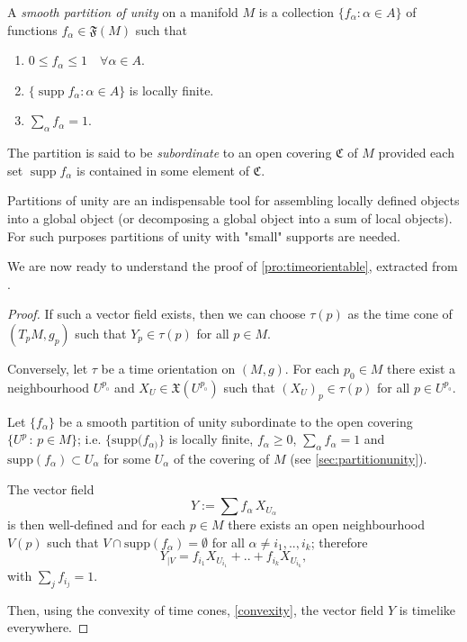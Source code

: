 \begin{definition}
	A \emph{smooth partition of unity} on a manifold $M$ is a collection $\{f_\alpha \colon \alpha \in A\}$ of functions $f_\alpha \in \mathfrak{F}(M)$ such that
	\begin{enumerate}
		\item $0 \leq f_\alpha \leq 1 \quad \forall \alpha \in A$.
		\item $\{\operatorname{supp} f_\alpha \colon \alpha \in A\}$ is locally finite.
		\item $\sum_\alpha f_\alpha = 1$.
	\end{enumerate}
	
	The partition is said to be \emph{subordinate} to an open covering $\mathfrak{C}$ of $M$ provided each set $\operatorname{supp} f_\alpha$ is contained in some element of $\mathfrak{C}$.
\end{definition}

Partitions of unity are an indispensable tool for assembling locally defined  objects into a global object (or decomposing a global object into a sum of local objects). For such purposes  partitions of unity with "small" supports are needed.

We are now ready to understand the proof of \autoref{pro:timeorientable}, extracted from \cite[p. 201]{romero10}.

\begin{proof}
	If such a vector field exists, then we can choose $\tau(p)$ as the time cone of $(T_pM,g_p)$ such that $Y_p\in \tau(p)$ for all $p\in M$.
	
	Conversely, let $\tau$ be a time orientation on $(M,g)$. For each $p_0 \in M$ there exist a neighbourhood $U^{p_{_0}}$ and $X_U\in \mathfrak{X}(U^{p_{_0}})$ such that $(X_U)_p \in \tau(p)$ for all $p\in U^{p_{_0}}$.
	
	Let $\{f_{\alpha}\}$ be a smooth partition of unity subordinate to the open covering $\{U^p\, : \, p\in M\}$; i.e. $\{\mathrm{supp}(f_{\alpha)}\}$ is locally finite, $f_{\alpha}\geq 0$, $\sum_{\alpha} f_{\alpha}=1$ and $\mathrm{supp}(f_{\alpha}) \subset U_{\alpha}$ for some $U_{\alpha}$ of the covering of $M$ (see \autoref{sec:partitionunity}).
	
	The vector field 
	\[
		Y:=\sum f_{\alpha}\, X_{U_{\alpha}}
	\] 
	is then well-defined and for each $p\in M$ there exists an open neighbourhood $V(p)$ such that $V \cap \mathrm{supp}(f_{\alpha}) = \emptyset$ for all $\alpha \neq i_1,..,i_k$; therefore
	\[
		Y_{\mid V}=f_{i_1}X_{U_{i_1}}+..+f_{i_k}X_{U_{i_k}},
	\]
	with $\sum_j f_{i_j}=1$.
	
	Then, using the convexity of time cones, \autoref{convexity}, the vector field $Y$ is timelike everywhere.
\end{proof}

